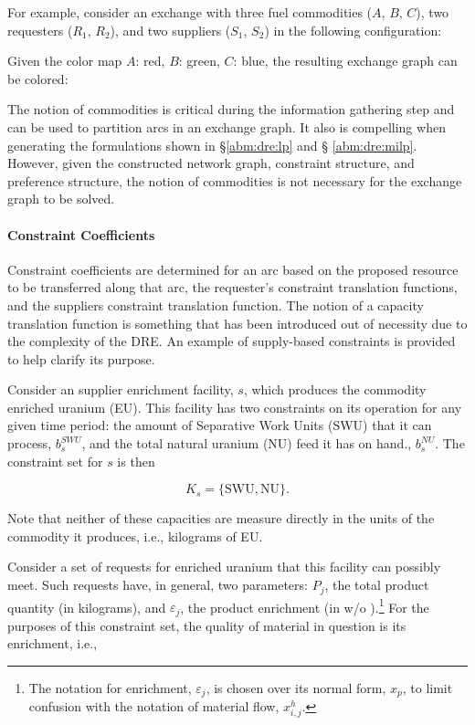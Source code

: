 For example, consider an exchange with three fuel commodities ($A$, $B$, $C$),
two requesters ($R_1$, $R_2$), and two suppliers ($S_1$, $S_2$) in the following
configuration:


Given the color map $A$: red, $B$: green, $C$: blue, the resulting exchange
graph can be colored:


The notion of commodities is critical during the information gathering step and
can be used to partition arcs in an exchange graph. It also is compelling when
generating the formulations shown in \S \ref{abm:dre:lp} and \S
\ref{abm:dre:milp}. However, given the constructed network graph, constraint
structure, and preference structure, the notion of commodities is not necessary
for the exchange graph to be solved.

\paragraph{Constraint Coefficients}

Constraint coefficients are determined for an arc based on the proposed resource
to be transferred along that arc, the requester's constraint translation
functions, and the suppliers constraint translation function. The notion of a
capacity translation function is something that has been introduced out of
necessity due to the complexity of the DRE. An example of supply-based
constraints is provided to help clarify its purpose.

Consider an supplier enrichment facility, $s$, which produces the commodity
enriched uranium (EU). This facility has two constraints on its operation for
any given time period: the amount of Separative Work Units (SWU) that it can
process, $b_{s}^{SWU}$, and the total natural uranium (NU) feed it has on hand.,
$b_{s}^{NU}$. The constraint set for $s$ is then
 
\begin{equation}\label{eqs:enr-constr-commods}
  K_{s} = \{ \mbox{SWU}, \mbox{NU} \}.
\end{equation}

Note that neither of these capacities are measure directly in the units of the
commodity it produces, i.e., kilograms of EU.

Consider a set of requests for enriched uranium that this facility can possibly
meet. Such requests have, in general, two parameters: $P_{j}$, the total product
quantity (in kilograms), and $\varepsilon_{j}$, the product enrichment (in w/o
).\footnote{The notation for enrichment, $\varepsilon_{j}$, is
  chosen over its normal form, $x_p$, to limit confusion with the notation of
  material flow, $x^h_{i,j}$.}  For the purposes of this constraint set, the
quality of material in question is its enrichment, i.e.,

